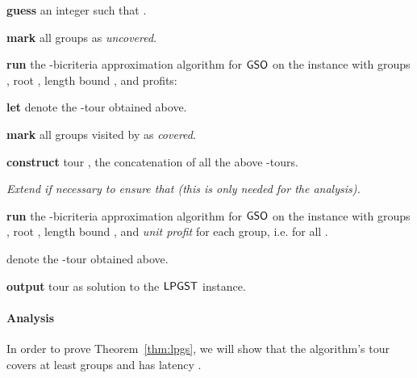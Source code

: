 \documentclass[11pt]{article}
\def\lpgst{\ensuremath{{\sf LPGST}}\xspace}
\def\gso{\ensuremath{{\sf GSO}}\xspace}
\begin{document}
\begin{algorithm}[ht]
  \caption{Algorithm for \lpgst}
  \label{alg:lpgst}
  \begin{algorithmic}[1]
    \STATE \label{step:grpSt:0} \textbf{guess} an integer  such that .

    \STATE \textbf{mark} all groups as {\em uncovered}.

    \FOR{}

    \STATE \label{step:grpSt:1} \textbf{run} the -bicriteria approximation algorithm for \gso  on the instance with
    groups , root , length bound , and profits:
    

    \STATE \textbf{let}  denote the -tour obtained above.

    \STATE \textbf{mark} all groups visited by  as {\em
      covered}.

    \ENDFOR

    \STATE \label{step:grpSt:3'} \textbf{construct} tour , the concatenation of all the above
    -tours. 
    
    \STATE \label{step:grpSt:3} {\em Extend  if necessary to ensure that  (this is only needed for the analysis).}

    \STATE \label{step:grpSt:2} \textbf{run} the -bicriteria approximation algorithm for \gso  on the instance with groups , root ,
    length bound , and {\em unit profit} for each group, i.e.  for all . 
    
      denote the
  -tour obtained above.

    \STATE \textbf{output} tour  as solution to the \lpgst instance.
  \end{algorithmic}
\end{algorithm}




\paragraph{Analysis} 
In order to prove Theorem~\ref{thm:lpgs}, we will show that the algorithm's tour covers at least  groups and has latency .
\end{document}
